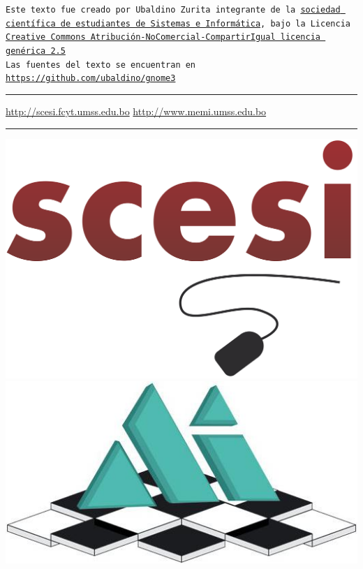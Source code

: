 \documentclass[12pt,letterpaper]{book}
\begin{document}
\begin{titlepage}
\begin{center}
{\small \tt Este texto fue creado por Ubaldino Zurita  integrante de la \href{http://scesi.fcyt.umss.edu.bo}{sociedad científica de estudiantes de Sistemas e Informática}, bajo la Licencia\\ \href{http://creativecommons.org/licenses/by-nc-sa/2.5/deed.es}{Creative Commons Atribución-NoComercial-CompartirIgual licencia genérica 2.5}\\
Las fuentes del texto se encuentran en \url{https://github.com/ubaldino/gnome3}}
     \end{center}
	\hrule
	\vspace{0.1cm}
	\noindent\small{\url{http://scesi.fcyt.umss.edu.bo} \hfill \url{http://www.memi.umss.edu.bo}}
	\hrule
	\vspace{0.1cm}
	\noindent\small{\hspace{1.15cm}\includegraphics[scale=0.06]{img/scesi.png} \hfill \includegraphics[scale=0.23]{img/memi.jpg}\hspace{0.83cm}}
\end{titlepage}
\thispagestyle{empty}
\end{document}

